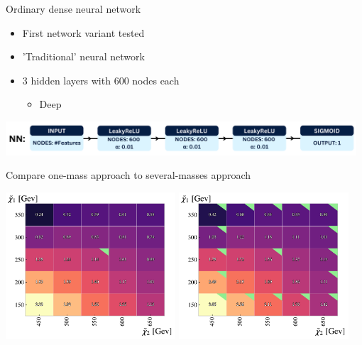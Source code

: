 \documentclass[UKenglish]{beamer}
\begin{document}
\begin{frame}{Ordinary dense neural network}
    \begin{itemize}
        \item First network variant tested
        \item 'Traditional' neural network
        \item 3 hidden layers with 600 nodes each
        \begin{itemize}
            \item Deep
        \end{itemize}
    \end{itemize}
    \vfill
    \centering
    \includegraphics[width = 0.98\textwidth]{figures/NN.png}
\end{frame}
\begin{frame}{Compare one-mass approach to several-masses approach}
    \vfill
    \begin{center}
        \includegraphics[width = 0.475\textwidth]{figures/grids/NN_OneMass_InterpolationGridSig.pdf}
        \includegraphics[width = 0.475\textwidth]{figures/grids/NN_InterpolationGridSig.pdf}
    \end{center}
\end{frame}
\end{document}
